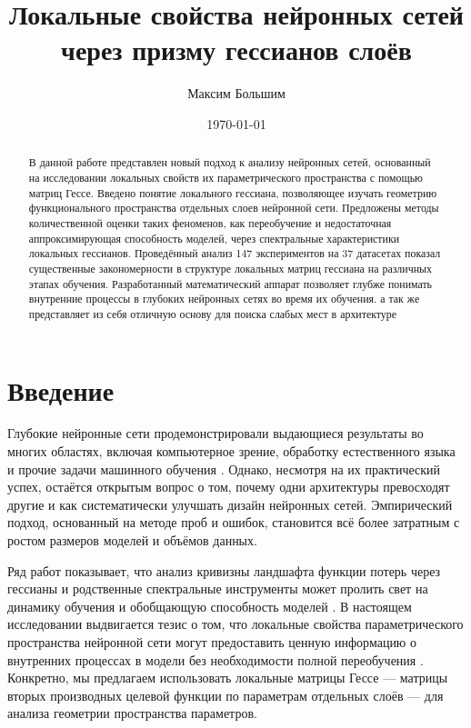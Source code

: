 \documentclass[a4paper,12pt]{article}
\title{Локальные свойства нейронных сетей через призму гессианов слоёв}
\author{Максим Большим}
\date{\today}
\begin{document}
\maketitle

\begin{abstract}
  В данной работе представлен новый подход к анализу нейронных сетей, основанный на исследовании локальных
  свойств их параметрического пространства с помощью матриц Гессе. Введено понятие локального гессиана,
  позволяющее изучать геометрию функционального пространства отдельных слоев нейронной сети. Предложены
  методы количественной оценки таких феноменов, как переобучение и недостаточная аппроксимирующая способность
  моделей, через спектральные характеристики локальных гессианов. Проведённый анализ 147 экспериментов на 37
  датасетах показал существенные закономерности в структуре локальных матриц гессиана на различных этапах обучения.
  Разработанный математический аппарат позволяет глубже понимать внутренние процессы в глубоких нейронных
  сетях во время их обучения. а так же представляет из себя отличную основу для поиска слабых мест в архитектуре
\end{abstract}

\section{Введение}

Глубокие нейронные сети продемонстрировали выдающиеся результаты во многих областях, включая компьютерное
зрение, обработку естественного языка и прочие задачи машинного обучения \cite{lecun2015deep,
goodfellow2016deep}. Однако, несмотря на их практический успех, остаётся открытым вопрос о том, почему одни
архитектуры превосходят другие и как систематически улучшать дизайн нейронных сетей. Эмпирический подход,
основанный на методе проб и ошибок, становится всё более затратным с ростом размеров моделей и объёмов данных.

Ряд работ показывает, что анализ кривизны ландшафта функции потерь через гессианы и родственные спектральные
инструменты может пролить свет на динамику обучения и обобщающую способность моделей
\cite{sagun2017empirical, maheswaranathan2019universality, lee2019wide, arora2019finegrained}. В настоящем
исследовании выдвигается тезис о том, что локальные свойства параметрического пространства нейронной сети
могут предоставить ценную информацию о внутренних процессах в модели без необходимости полной переобучения
\cite{poole2016transient}. Конкретно, мы предлагаем использовать локальные матрицы Гессе — матрицы вторых
производных целевой функции по параметрам отдельных слоёв — для анализа геометрии пространства параметров.
\end{document}
